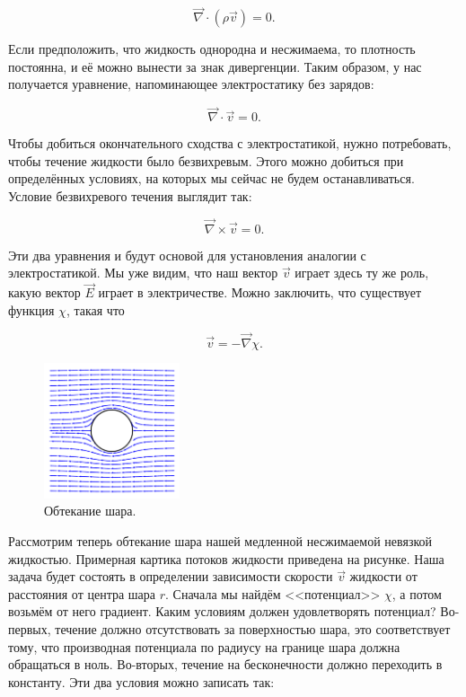 \documentclass[11pt,a4paper]{article}
\numberwithin{equation}{section}
\newcommand{\vn}{\vec{\nabla}}
\begin{document}
\begin{equation}
  \label{eq:hydro_1}
  \vn \cdot (\rho \vec{v}) =0.
\end{equation}

Если предположить, что жидкость однородна и несжимаема, то плотность
постоянна, и её можно вынести за знак дивергенции. Таким образом, у
нас получается уравнение, напоминающее электростатику без зарядов: 

\begin{equation}
  \label{eq:hydro_2}
  \vn \cdot \vec{v} = 0.
\end{equation}

Чтобы добиться окончательного сходства с электростатикой, нужно
потребовать, чтобы течение жидкости было безвихревым. Этого можно
добиться при определённых условиях, на которых мы сейчас не будем
останавливаться. Условие безвихревого течения выглядит так: 

\begin{equation}
  \label{eq:hydro_3}
  \vn \times \vec{v} = 0.
\end{equation}

Эти два уравнения и будут основой для установления аналогии с
электростатикой. Мы уже видим, что наш вектор $\vec{v}$ играет здесь
ту же роль, какую вектор $\vec{E}$ играет в электричестве. Можно
заключить, что существует функция $\chi$, такая что

\begin{equation}
  \label{eq:hydro_4}
  \vec{v} = - \vn \chi.
\end{equation}


\begin{figure}
  \vspace{-1cm}
  \begin{center}
    \includegraphics[width=4cm,height=4cm]{fluid_lines.pdf}
  \end{center}
  \vspace{-0.7cm}
  \caption{Обтекание шара.}
  \label{fig:hydro}
\end{figure}


Рассмотрим теперь обтекание шара нашей медленной несжимаемой невязкой
жидкостью. Примерная картика потоков жидкости приведена на
рисунке. Наша задача будет состоять в определении зависимости скорости
$\vec{v}$ жидкости от расстояния от центра шара $r$. Сначала мы найдём
<<потенциал>> $\chi$, а потом возьмём от него градиент. Каким условиям
должен удовлетворять потенциал? Во-первых, течение должно
отсутствовать за поверхностью шара, это соответствует тому, что
производная потенциала по радиусу на границе шара должна обращаться в
ноль. Во-вторых, течение на бесконечности должно переходить в
константу. Эти два условия можно записать так:
\end{document}
